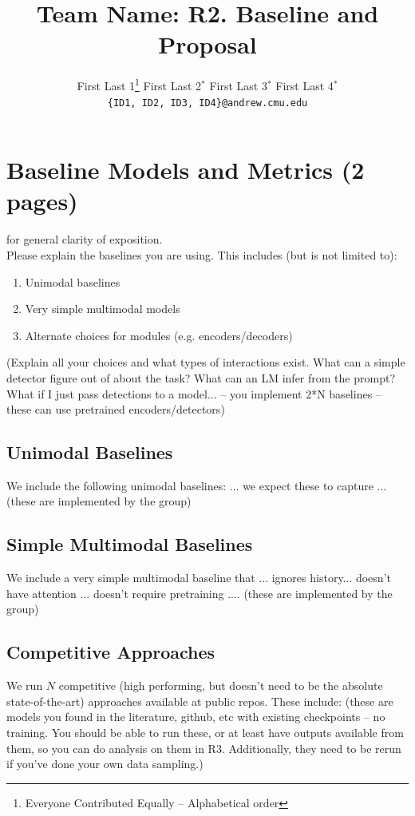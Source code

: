 \documentclass{article} %
\title{Team Name: R2. Baseline and Proposal}
\author{
  First Last 1\thanks{\hspace{4pt}Everyone Contributed Equally -- Alphabetical order} \hspace{2em} First Last 2$^*$ \hspace{2em} First Last 3$^*$ \hspace{2em} First Last 4$^*$ \\
  \texttt{\{ID1, ID2, ID3, ID4\}@andrew.cmu.edu}
  }
\date{}
\begin{document}
\maketitle


\section{Baseline Models and Metrics (2 pages)}
 for general clarity of exposition. \\

Please explain the baselines you are using. This includes (but is not limited to):
\begin{enumerate}
  \item Unimodal baselines
  \item Very simple multimodal models  
  \item Alternate choices for modules (e.g. encoders/decoders)
\end{enumerate}

(Explain all your choices and what types of interactions exist. What can a simple detector figure out of about the task? What can an LM infer from the prompt? What if I just pass detections to a model... -- you implement 2*N baselines -- these can use pretrained encoders/detectors)

\subsection{ Unimodal Baselines}
We include the following unimodal baselines: ... we expect these to capture ... (these are implemented by the group)

\subsection{ Simple Multimodal Baselines}
We include a very simple multimodal baseline that ... ignores history... doesn't have attention ... doesn't require pretraining ....
(these are implemented by the group)

\subsection{ Competitive Approaches}
We run $N$ competitive (high performing, but doesn't need to be the absolute state-of-the-art) approaches available at public repos.  These include: 
(these are models you found in the literature, github, etc with existing checkpoints -- no training. You should be able to run these, or at least have outputs available from them, so you can do analysis on them in R3.  Additionally, they need to be rerun if you've done your own data sampling.)
\end{document}

